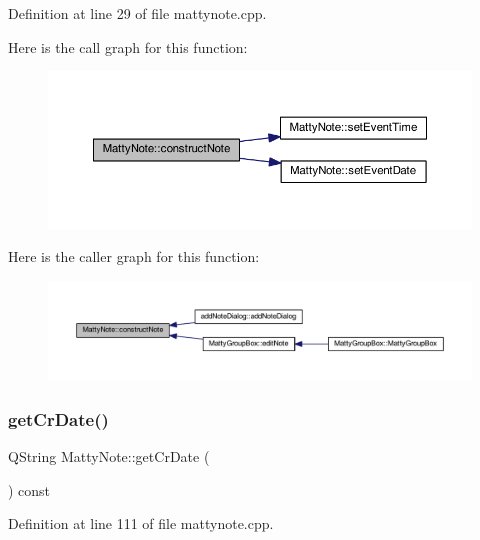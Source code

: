 Definition at line 29 of file mattynote.\+cpp.

Here is the call graph for this function\+:
\nopagebreak
\begin{figure}[H]
\begin{center}
\leavevmode
\includegraphics[width=350pt]{classMattyNote_a180cda16bc8c77964169edb90468c151_cgraph}
\end{center}
\end{figure}
Here is the caller graph for this function\+:
\nopagebreak
\begin{figure}[H]
\begin{center}
\leavevmode
\includegraphics[width=350pt]{classMattyNote_a180cda16bc8c77964169edb90468c151_icgraph}
\end{center}
\end{figure}
\hypertarget{classMattyNote_aed32bd27ebe176f3cedbc676a03f15ea}{}\label{classMattyNote_aed32bd27ebe176f3cedbc676a03f15ea} 
\subsubsection{\texorpdfstring{get\+Cr\+Date()}{getCrDate()}}
{\footnotesize\ttfamily Q\+String Matty\+Note\+::get\+Cr\+Date (\begin{DoxyParamCaption}{ }\end{DoxyParamCaption}) const}



Definition at line 111 of file mattynote.\+cpp.

